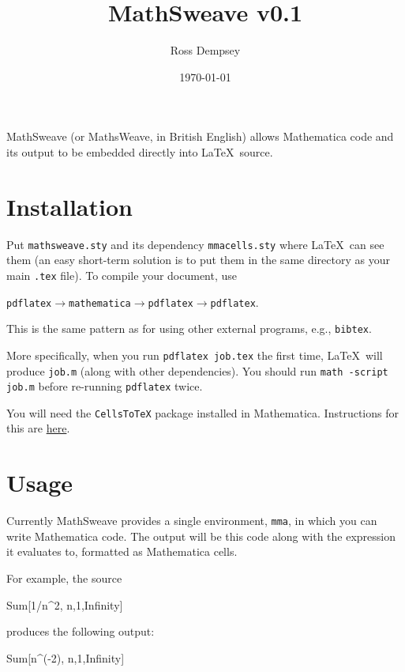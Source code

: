 \documentclass{article}
\title{MathSweave v0.1}
\author{Ross Dempsey}
\date{\today}
\begin{document}
\maketitle

MathSweave (or MathsWeave, in British English) allows Mathematica code and its output to be embedded directly into \LaTeX\ source.

\section{Installation}

Put \texttt{mathsweave.sty} and its dependency \texttt{mmacells.sty} where \LaTeX\ can see them (an easy short-term solution is to put them in the same directory as your main \texttt{.tex} file). To compile your document, use
\begin{center}
    \texttt{pdflatex}$\to$\texttt{mathematica}$\to$\texttt{pdflatex}$\to$\texttt{pdflatex}.
\end{center}
This is the same pattern as for using other external programs, e.g., \texttt{bibtex}.

More specifically, when you run \texttt{pdflatex job.tex} the first time, \LaTeX\ will produce \texttt{job.m} (along with other dependencies). You should run \texttt{math -script job.m} before re-running \texttt{pdflatex} twice.

You will need the \texttt{CellsToTeX} package installed in Mathematica. Instructions for this are \href{https://github.com/jkuczm/MathematicaCellsToTeX}{here}.

\section{Usage}

Currently MathSweave provides a single environment, \texttt{mma}, in which you can write Mathematica code. The output will be this code along with the expression it evaluates to, formatted as Mathematica cells.

For example, the source
\begin{texsource}
    \begin{mma}
        Sum[1/n^2, {n,1,Infinity}]
    \end{mma}
\end{texsource}
produces the following output:

\begin{mma}
    Sum[n^(-2), {n,1,Infinity}]
\end{mma}
\end{document}
